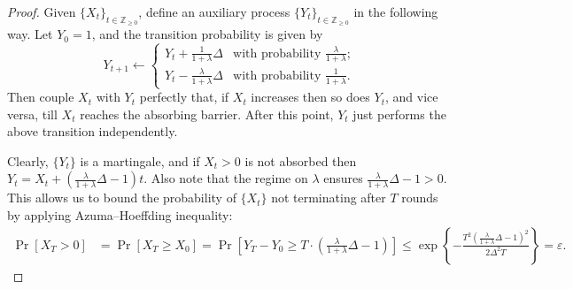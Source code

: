 \documentclass{theoretics}
\renewcommand{\Pr}{\mathop{\mathrm{Pr}}\nolimits}
\begin{document}
\begin{proof}
Given $\{X_t\}_{t\in\mathbb{Z}_{\geq 0}}$, define an auxiliary process $\{Y_t\}_{t\in\mathbb{Z}_{\geq 0}}$ in the following way.
Let $Y_0=1$, and the transition probability is given by
\begin{equation}
  Y_{t+1}\leftarrow\begin{cases}
  Y_t+\frac{1}{1+\lambda}\Delta & \text{with probability } \frac{\lambda}{1+\lambda}; \\
  Y_t-\frac{\lambda}{1+\lambda}\Delta & \text{with probability } \frac{1}{1+\lambda}. 
  \end{cases}
\end{equation}
Then couple $X_t$ with $Y_t$ perfectly that, if $X_t$ increases then so does $Y_t$, and vice versa, till $X_t$ reaches the absorbing barrier. 
After this point, $Y_t$ just performs the above transition independently. 

Clearly, $\{Y_t\}$ is a martingale, and if $X_t>0$ is not absorbed then 
$Y_t=X_t+\left(\frac{\lambda}{1+\lambda}\Delta-1\right)t$. 
Also note that the regime on $\lambda$ ensures $\frac{\lambda}{1+\lambda}\Delta-1>0$. 
This allows us to bound the probability of $\{X_t\}$ not terminating after $T$ rounds by applying Azuma--Hoeffding inequality:  
\begin{align*}
\Pr[X_T>0]&=\Pr[X_T\geq X_0]=\Pr\left[Y_T-Y_0\geq T\cdot\left(\frac{\lambda}{1+\lambda}\Delta-1\right)\right]\leq\exp\left\{-\frac{T^2\left(\frac{\lambda}{1+\lambda}\Delta-1\right)^2}{2\Delta^2 T}\right\}=\varepsilon.%
\end{align*}
\end{proof}

%
%
\end{document}
